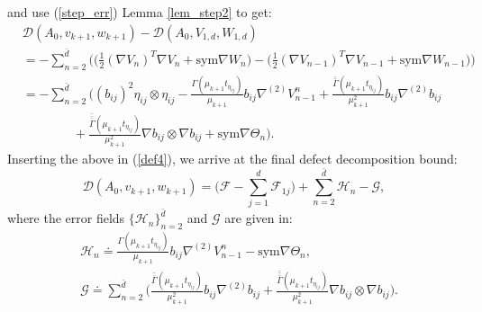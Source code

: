 \documentclass[reqno,twoside,11pt]{amsart}
\newcommand{\sym}{\mathrm{sym}}
\newcommand*{\dbar}[1]{\bar{\bar{#1}}}
\newcommand*{\tbar}[1]{\bar{\dbar{#1}}}
\numberwithin{equation}{section}
\theoremstyle{plain}
\theoremstyle{definition}
\begin{document}
and use (\ref{step_err}) Lemma \ref{lem_step2} to get:
\begin{equation*}
\begin{split}
& \mathcal{D}(A_0, v_{k+1}, w_{k+1}) - \mathcal{D}(A_0, V_{1,d},
W_{1,d}) \\ & = -\sum_{n=2}^{\bar d}\Big(\big(\frac{1}{2}(\nabla V_{n})^T \nabla V_{n} +
\sym\nabla W_{n}\big) - \big(\frac{1}{2}(\nabla V_{n-1})^T \nabla V_{n-1} +
\sym\nabla W_{n-1}\big)\Big)\\ & = - \sum_{n=2}^{\bar d}
\Big((b_{ij})^2\eta_{ij}\otimes\eta_{ij} - 
\frac{\Gamma(\mu_{k+1}t_{\eta_{ij}})}{\mu_{k+1}} b_{ij}\nabla^{(2)}V_{n-1}^n 
+ \frac{\dbar\Gamma(\mu_{k+1}t_{\eta_{ij}})}{\mu_{k+1}^{2}}  
b_{ij}\nabla^{(2)} b_{ij} \\ & \qquad \qquad + \frac{\tbar\Gamma(\mu_{k+1} t_{\eta_{ij}})}{\mu_{k+1}^{2}}  
\nabla b_{ij}\otimes \nabla b_{ij} +\sym\nabla\Theta_n\Big).
\end{split}
\end{equation*}
Inserting the above in (\ref{def4}), we arrive at the final defect
decomposition bound:
\begin{equation}\label{def5}
\mathcal{D}(A_0, v_{k+1}, w_{k+1}) = \Big(\mathcal{F} -
\sum_{j=1}^d\mathcal{F}_{1j} \Big)  + \sum_{n=2}^{\bar d}\mathcal{H}_n - \mathcal{G},
\end{equation}
where the error fields $\{\mathcal{H}_n\}_{n=2}^{\bar d}$ and $\mathcal{G}$ are given in:
\begin{equation}\label{GH}
\begin{split}
& \mathcal{H}_n \doteq \frac{\Gamma(\mu_{k+1}t_{\eta_{ij}})}{\mu_{k+1}} b_{ij}\nabla^{(2)}V_{n-1}^n - \sym\nabla\Theta_n,\\
& \mathcal{G} \doteq \sum_{n=2}^{\bar d} \Big(\frac{\dbar\Gamma(\mu_{k+1}t_{\eta_{ij}})}{\mu_{k+1}^{2}}  
b_{ij}\nabla^{(2)} b_{ij} + \frac{\tbar\Gamma(\mu_{k+1} t_{\eta_{ij}})}{\mu_{k+1}^{2}}  
\nabla b_{ij}\otimes \nabla b_{ij}\Big).
\end{split}
\end{equation}

\medskip
\end{document}
